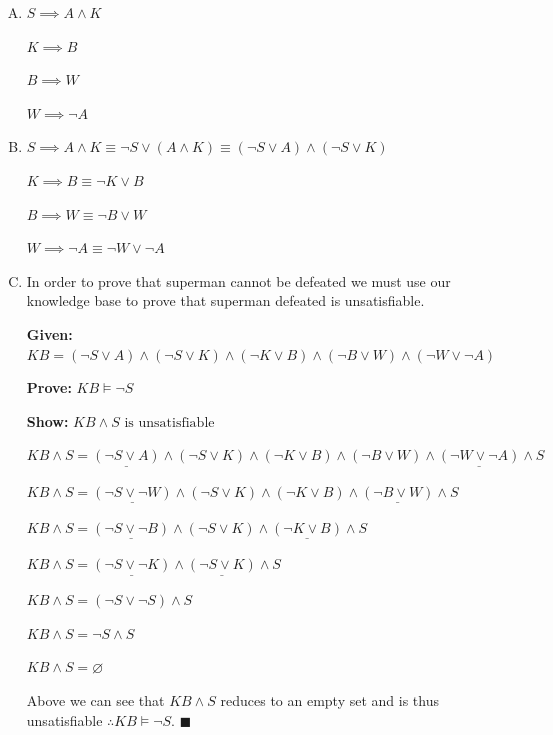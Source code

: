 \documentclass[10pt,a4paper]{article}
\begin{document}
	\begin{enumerate}[A.]	
	\item
	
	$S \implies A \land K$
	
	$K \implies B$
	
	$B \implies W$
	
	$W \implies \neg A$
	
	\item
	
	$S \implies A \land K \equiv \neg S \lor (A \land K) \equiv (\neg S \lor A) \land (\neg S \lor K)$
	
	$K \implies B \equiv \neg K \lor B$
	
	$B \implies W \equiv \neg B \lor W$
	
	$W \implies \neg A \equiv \neg W \lor \neg A$
	
	\item
	
	In order to prove that superman cannot be defeated we must use our knowledge base to prove that superman defeated is unsatisfiable.
	
	\textbf{Given:} $KB = (\neg S \lor A) \land (\neg S \lor K) \land (\neg K \lor B) \land (\neg B \lor W) \land (\neg W \lor \neg A)$
	
	\textbf{Prove:} $KB \vDash \neg S$
	
	\textbf{Show:} $KB \land S \text{ is unsatisfiable}$
	
	$KB \land S = \underline{(\neg S \lor A)} \land (\neg S \lor K) \land (\neg K \lor B) \land (\neg B \lor W) \land \underline{(\neg W \lor \neg A)} \land S$
	
	$KB \land S = \underline{(\neg S \lor \neg W)} \land (\neg S \lor K) \land (\neg K \lor B) \land \underline{(\neg B \lor W)} \land S$
	
	$KB \land S = \underline{(\neg S \lor \neg B)} \land (\neg S \lor K) \land \underline{(\neg K \lor B)} \land S$
	
	$KB \land S = \underline{(\neg S \lor \neg K)} \land \underline{(\neg S \lor K)} \land S$
	
	$KB \land S = (\neg S \lor \neg S) \land S$
	
	$KB \land S = \neg S \land S$
	
	$KB \land S = \varnothing$
	
	Above we can see that $KB \land S$ reduces to an empty set and is thus unsatisfiable $\therefore KB \vDash \neg S$. $\blacksquare$
	
	\end{enumerate}
	
\end{document}
